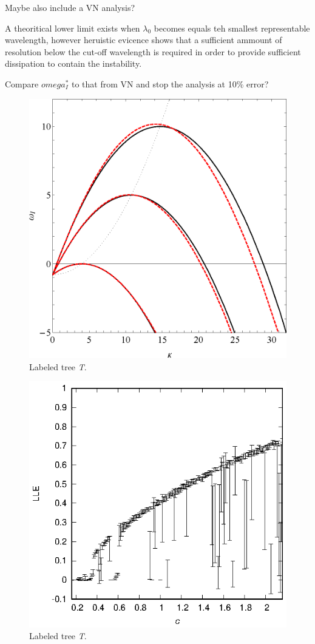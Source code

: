 \documentclass{ws-ijbc}
\begin{document}
Maybe also include a VN analysis? 


A theoritical lower limit exists when $\lambda_0$ becomes equals teh smallest representable wavelength, however heruistic evicence shows that a sufficient ammount of resolution below the cut-off wavelength is required in order to provide sufficient dissipation to contain the instability. 

Compare $omega_I^*$ to that from VN and stop the analysis at 10\% error? 


\begin{figure}[htbp]
\begin{center}
\includegraphics[width=0.5\linewidth]{kvomega.eps}
\end{center}
\caption{Labeled tree {\it T}.}
\label{figxyz}
\end{figure}



\begin{figure}[htbp]
\begin{center}
\includegraphics[width=0.5\linewidth]{lle.eps}
\end{center}
\caption{Labeled tree {\it T}.}
\label{figxyz}
\end{figure}
\end{document}

